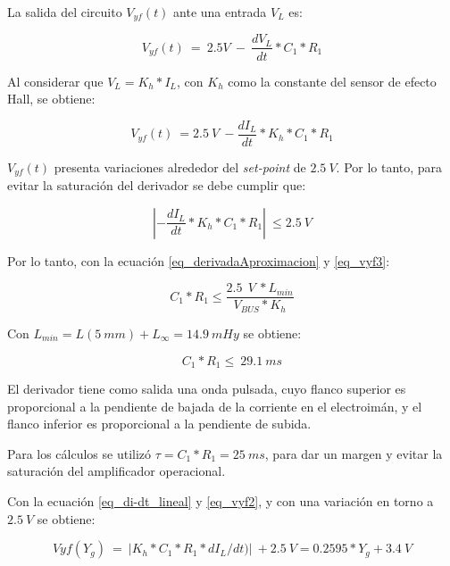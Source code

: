 \noindent La salida del circuito $V_{yf}(t)$ ante una entrada $V_L$ es:

\begin{equation} \label{eq_vyf1}
	V_{yf}(t)\ =\ 2.5V\ -\ \frac{dV_L}{dt}*C_1*R_1
\end{equation}


\noindent Al considerar que $V_L=K_h*I_L$, con $K_h$ como la constante del sensor de efecto Hall, se obtiene: 

\begin{equation} \label{eq_vyf2}
	V_{yf}(t)\ =2.5\:V\ -\frac{dI_L}{dt}*K_h*C_1*R_1
\end{equation}

\noindent $V_{yf}(t)$ presenta variaciones alrededor del \textsl{set-point} de $2.5\:V$. Por lo tanto, para evitar la saturaci\'{o}n del derivador se debe cumplir que:

\begin{equation} \label{eq_vyf3}
	\left|-\frac{dI_L}{dt}*K_h*C_1*R_1\right|\ \le 2.5\:V
\end{equation}

\noindent Por lo tanto, con la ecuaci\'{o}n \ref{eq_derivadaAproximacion} y \ref{eq_vyf3}:

\begin{equation} \label{eq_condicionC1-R1}
	C_1*R_1\le\frac{2.5\ \:V\ *L_{min}}{V_{BUS}*K_h}
\end{equation}

\noindent Con $L_{min}= L(5\: mm) + L_{\infty}= 14.9\: mHy$ se obtiene: 

\begin{equation} \label{eq_condicionC1-R1-2}
	C_1*R_1\le\ 29.1\ ms
\end{equation}

\noindent El derivador tiene como salida una onda pulsada, cuyo flanco superior  es proporcional a la pendiente de bajada de la corriente en el electroim\'{a}n, y el flanco inferior es proporcional a la pendiente de subida. 

\noindent Para los c\'{a}lculos se utiliz\'{o} $\tau = C_1*R_1= 25\:ms$, para dar un margen y evitar la saturaci\'{o}n del amplificador operacional.  

\noindent Con la ecuaci\'{o}n \ref{eq_di-dt_lineal} y \ref{eq_vyf2}, y con una variaci\'{o}n en torno a $2.5\:V$ se obtiene:


\begin{equation} \label{eq_Vyf-lineal}
	Vyf(Y_g)\ =\ |K_h*C_1*R_1*dI_L/dt)|\ +2.5\:V=0.2595*Y_g+3.4\:V
\end{equation}

